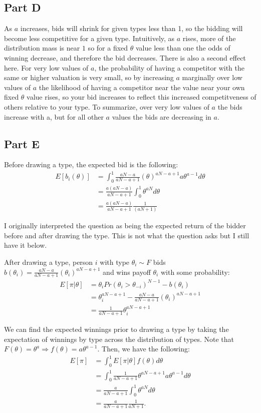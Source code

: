 \documentclass[11pt]{article} %
\begin{document}
\subsection{Part D}
As $a$ increases, bids will shrink for given types less than 1, so the bidding will become less competitive for a given type. Intuitively, as $a$ rises, more of the distribution mass is near $1$ so for a fixed $\theta$ value less than one the odds of winning decrease, and therefore the bid decreases. There is also a second effect here. For very low values of $a$, the probability of having a competitor with the same or higher valuation is very small, so by increasing $a$ marginally over low values of $a$ the likelihood of having a competitor near the value near your own fixed $\theta$ value rises, so your bid increases to reflect this increased competitveness of others relative to your type. To summarize, over very low values of $a$ the bids increase with a, but for all other $a$ values the bids are decreasing in $a$.
\subsection{Part E}

Before drawing a type, the expected bid is the following:
\begin{align*}
E[b_i(\theta)] &= \int_{0}^{1} \frac{aN-a}{aN-a+1}(\theta)^{aN-a+1}  a\theta^{a-1} d\theta \\
&=  \frac{a(aN-a)}{aN-a+1} \int_{0}^{1}\theta^{aN}d\theta\\
&=   \frac{a(aN-a)}{aN-a+1}\frac{1}{(aN+1)} 
\end{align*}

I originally interpreted the question as being the expected return of the bidder before and after drawing the type. This is not what the question asks but I still have it below.

After drawing a type, person $i$ with type $\theta_i \sim F$ bids $b(\theta_i) =  \frac{aN-a}{aN-a+1}(\theta_i)^{aN-a+1}$ and wins payoff $\theta_i$ with some probability:
\begin{align*}
E[\pi|\theta] &= \theta_i Pr(\theta_i>\theta_{-i})^{N-1} - b(\theta_i)\\
&= \theta_i^{aN-a+1} - \frac{aN-a}{aN-a+1}(\theta_i)^{aN-a+1}\\
&= \frac{1}{aN - a + 1}\theta_i^{aN-a+1}
\end{align*}

We can find the expected winnings prior to drawing a type by taking the expectation of winnings by type across the distribution of types. Note that $F(\theta) = \theta^a \Rightarrow f(\theta) = a\theta^{a-1}$. Then, we have the following:
\begin{align*}
E[\pi] &= \int_{0}^1 E[\pi|\theta] f(\theta)d\theta \\
&=  \int_{0}^1\frac{1}{aN - a + 1}\theta^{aN-a+1} a\theta^{a-1}d\theta\\
&= \frac{a}{aN - a + 1}\int_{0}^1\theta^{aN} d\theta\\
&=  \frac{a}{aN - a + 1} \frac{1}{aN+1}.
\end{align*}
\end{document}
